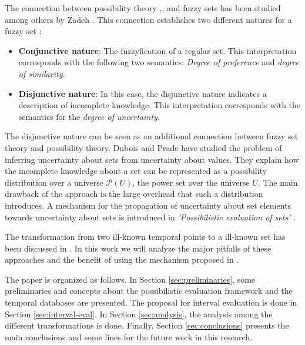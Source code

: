 \documentclass[twoside,twocolumn,a4paper]{article}
\newcommand{\Pow}{\mathcal{P}}
\begin{document}
The connection between possibility theory \cite{Zadeh78},\cite{Shackle61},\cite{Gaines75} and fuzzy sets has been studied among others by Zadeh \cite{Zadeh65}. This connection establishes two different natures for a fuzzy set \cite{Dubois97}:
\begin{itemize}
\item
\textbf{Conjunctive nature}: The fuzzyfication of a regular set. This interpretation corresponds with the following two semantics: \textit{Degree of preference} and \textit{degree of similarity}.
\item
\textbf{Disjunctive nature}: In this case, the disjunctive nature indicates a description of incomplete knowledge. This interpretation corresponds with the semantics for the \textit{degree of uncertainty}.
\end{itemize}

The disjunctive nature can be seen as an additional connection between fuzzy set theory and possibility theory. Dubois and Prade \cite{Dubois88b} have studied the problem of inferring uncertainty about sets from uncertainty about values. They explain how the incomplete knowledge about a set can be represented as a possibility distribution over a universe $\Pow \left(U \right)$, the power set over the universe $U$. The main drawback of the approach is the large overhead that such a distribution introduces.  A mechanism for the propagation of uncertainty about set elements towards uncertainty about sets is introduced in \textit{'Possibilistic evaluation of sets'} \cite{Pon11}.

The transformation from two ill-known temporal points to a ill-known set has been discussed in \cite{Garrido2009}. In this work we will analyze the major pitfalls of these approaches and the benefit of using the mechanism proposed in \cite{Pon11}.

The paper is organized as follows. In Section \ref{sec:preliminaries}, some preliminaries and concepts about the possibilistic evaluation framework and the temporal databases are presented. The proposal for interval evaluation is done in Section \ref{sec:interval-eval}. In Section \ref{sec:analysis}, the analysis among the different transformations is done. Finally, Section \ref{sec:conclusions} presents the main conclusions and some lines for the future work in this research.
\end{document}
